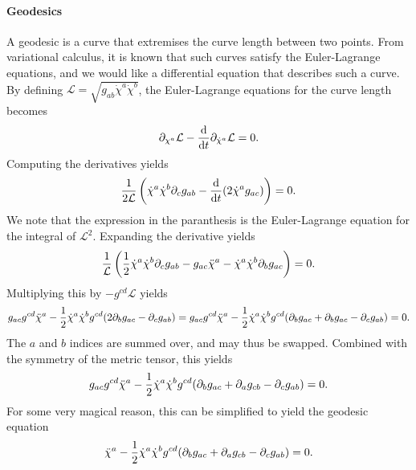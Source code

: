 \paragraph{Geodesics}
A geodesic is a curve that extremises the curve length between two points. From variational calculus, it is known that such curves satisfy the Euler-Lagrange equations, and we would like a differential equation that describes such a curve. By defining $\mathcal{L} = \sqrt{g_{ab}\dot{\chi}^{a}\dot{\chi}^{b}}$, the Euler-Lagrange equations for the curve length becomes
\begin{align*}
	\partial_{\chi^{a}}\mathcal{L} - \dv{t}\partial_{\dot{\chi}^{a}}\mathcal{L} = 0.
\end{align*}
Computing the derivatives yields
\begin{align*}
	\frac{1}{2\mathcal{L}}\left(\dot{\chi}^{a}\dot{\chi}^{b}\partial_{c}g_{ab} - \dv{t}(2\dot{\chi}^{a}g_{ac})\right) = 0.
\end{align*}
We note that the expression in the paranthesis is the Euler-Lagrange equation for the integral of $\mathcal{L}^{2}$. Expanding the derivative yields
\begin{align*}
	\frac{1}{\mathcal{L}}\left(\frac{1}{2}\dot{\chi}^{a}\dot{\chi}^{b}\partial_{c}g_{ab} - g_{ac}\ddot{\chi}^{a} - \dot{\chi}^{a}\dot{\chi}^{b}\partial_{b}g_{ac}\right) = 0.
\end{align*}
Multiplying this by $-g^{cd}\mathcal{L}$ yields
\begin{align*}
	g_{ac}g^{cd}\ddot{\chi}^{a} - \frac{1}{2}\dot{\chi}^{a}\dot{\chi}^{b}g^{cd}(2\partial_{b}g_{ac} - \partial_{c}g_{ab}) = g_{ac}g^{cd}\ddot{\chi}^{a} - \frac{1}{2}\dot{\chi}^{a}\dot{\chi}^{b}g^{cd}(\partial_{b}g_{ac} + \partial_{b}g_{ac} - \partial_{c}g_{ab}) = 0.
\end{align*}
The $a$ and $b$ indices are summed over, and may thus be swapped. Combined with the symmetry of the metric tensor, this yields
\begin{align*}
	g_{ac}g^{cd}\ddot{\chi}^{a} - \frac{1}{2}\dot{\chi}^{a}\dot{\chi}^{b}g^{cd}(\partial_{b}g_{ac} + \partial_{a}g_{cb} - \partial_{c}g_{ab}) = 0.
\end{align*}
For some very magical reason, this can be simplified to yield the geodesic equation
\begin{align*}
	\ddot{\chi}^{a} - \frac{1}{2}\dot{\chi}^{a}\dot{\chi}^{b}g^{cd}(\partial_{b}g_{ac} + \partial_{a}g_{cb} - \partial_{c}g_{ab}) = 0.
\end{align*}

